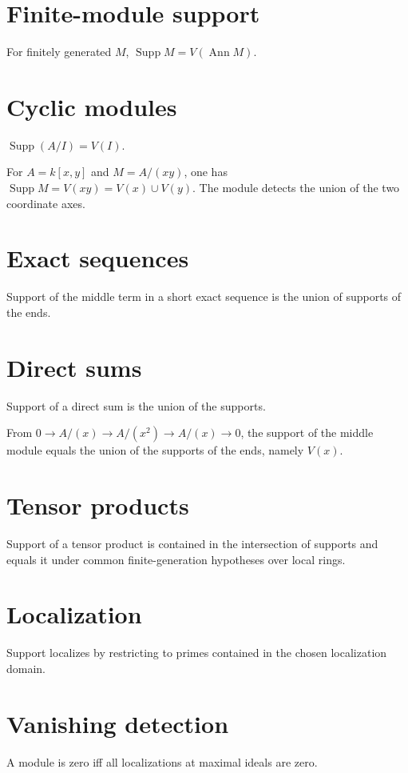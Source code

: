 \section{Finite-module support}
For finitely generated $M$, $\operatorname{Supp}M=V(\operatorname{Ann}M)$.

\section{Cyclic modules}
$\operatorname{Supp}(A/I)=V(I)$.

\begin{example}\label{ex:v16-expand-02}
For $A=k[x,y]$ and $M=A/(xy)$, one has $\operatorname{Supp}M=V(xy)=V(x)\cup V(y)$. The module detects the union of the two coordinate axes.
\end{example}
\section{Exact sequences}
Support of the middle term in a short exact sequence is the union of supports of the ends.

\section{Direct sums}
Support of a direct sum is the union of the supports.

\begin{example}\label{ex:v16-expand-03}
From $0\to A/(x)\to A/(x^2)\to A/(x)\to0$, the support of the middle module equals the union of the supports of the ends, namely $V(x)$.
\end{example}
\section{Tensor products}
Support of a tensor product is contained in the intersection of supports and equals it under common finite-generation hypotheses over local rings.

\section{Localization}
Support localizes by restricting to primes contained in the chosen localization domain.

\section{Vanishing detection}
A module is zero iff all localizations at maximal ideals are zero.


